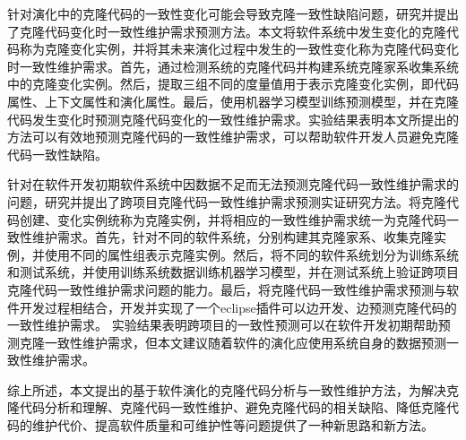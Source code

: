 {针对演化中的克隆代码的一致性变化可能会导致克隆一致性缺陷问题，研究并提出了克隆代码变化时一致性维护需求预测方法。本文将软件系统中发生变化的克隆代码称为克隆变化实例，并将其未来演化过程中发生的一致性变化称为克隆代码变化时一致性维护需求。首先，通过检测系统的克隆代码并构建系统克隆家系收集系统中的克隆变化实例。然后，提取三组不同的度量值用于表示克隆变化实例，即代码属性、上下文属性和演化属性。最后，使用机器学习模型训练预测模型，并在克隆代码发生变化时预测克隆代码变化的一致性维护需求。实验结果表明本文所提出的方法可以有效地预测克隆代码的一致性维护需求，可以帮助软件开发人员避免克隆代码一致性缺陷。

针对在软件开发初期软件系统中因数据不足而无法预测克隆代码一致性维护需求的问题，研究并提出了跨项目克隆代码一致性维护需求预测实证研究方法。将克隆代码创建、变化实例统称为克隆实例，并将相应的一致性维护需求统一为克隆代码一致性维护需求。首先，针对不同的软件系统，分别构建其克隆家系、收集克隆实例，并使用不同的属性组表示克隆实例。然后，将不同的软件系统划分为训练系统和测试系统，并使用训练系统数据训练机器学习模型，并在测试系统上验证跨项目克隆代码一致性维护需求问题的能力。最后，将克隆代码一致性维护需求预测与软件开发过程相结合，开发并实现了一个eclipse插件可以边开发、边预测克隆代码的一致性维护需求。 实验结果表明跨项目的一致性预测可以在软件开发初期帮助预测克隆一致性维护需求，但本文建议随着软件的演化应使用系统自身的数据预测一致性维护需求。%

综上所述，本文提出的基于软件演化的克隆代码分析与一致性维护方法，为解决克隆代码分析和理解、克隆代码一致性维护、避免克隆代码的相关缺陷、降低克隆代码的维护代价、提高软件质量和可维护性等问题提供了一种新思路和新方法。
}


